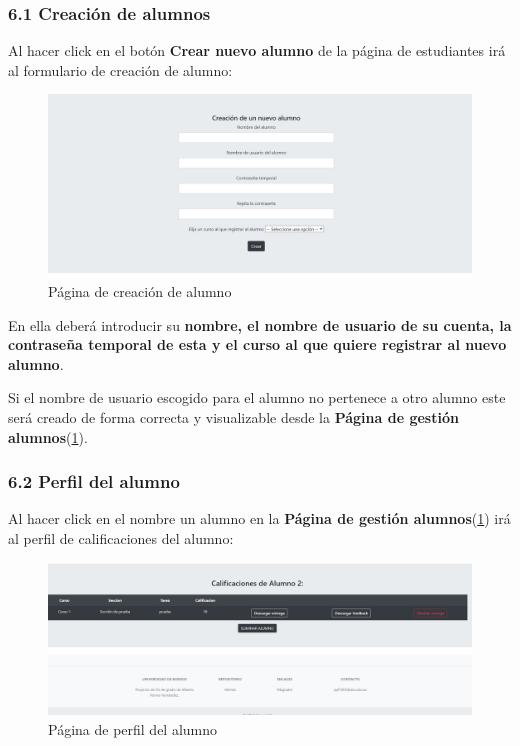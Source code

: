 \subsubsection{6.1 Creación de alumnos}
Al hacer click en el botón \textbf{Crear nuevo alumno} de la página de estudiantes irá al formulario de creación de alumno:

\begin{figure}[H]
\centering
\includegraphics[width=\textwidth]{img/imgs-memoria/crearAlumno.PNG}
\caption{Página de creación de alumno}
\label{PagGesAlu}
\end{figure}

En ella deberá introducir su \textbf{nombre, el nombre de usuario de su cuenta, la contraseña temporal de esta y el curso al que quiere registrar al nuevo alumno}.

Si el nombre de usuario escogido para el alumno no pertenece a otro alumno este será creado de forma correcta y visualizable desde la \textbf{Página de gestión alumnos}(\ref{PagGesAlu}).

\subsubsection{6.2 Perfil del alumno}
Al hacer click en el nombre un alumno en la \textbf{Página de gestión alumnos}(\ref{PagGesAlu}) irá al perfil de calificaciones del alumno:

\begin{figure}[H]
\centering
\includegraphics[width=\textwidth]{img/imgs-memoria/califAlumno.PNG}
\caption{Página de perfil del alumno}
\end{figure}

